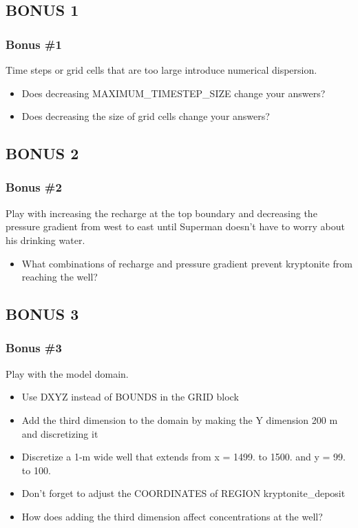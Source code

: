 \documentclass{beamer}
\begin{document}
\subsection{BONUS 1}

\begin{frame}[fragile]\frametitle{Bonus \#1}
Time steps or grid cells that are too large introduce numerical dispersion.

\begin{itemize}
  \item Does decreasing MAXIMUM\_TIMESTEP\_SIZE change your answers?
  \item Does decreasing the size of grid cells change your answers?
\end{itemize}

\end{frame}

\subsection{BONUS 2}

\begin{frame}[fragile]\frametitle{Bonus \#2}
Play with increasing the recharge at the top boundary and decreasing the pressure gradient from west to east until Superman doesn't have to worry about his drinking water.

\begin{itemize}
  \item What combinations of recharge and pressure gradient prevent kryptonite from reaching the well?
\end{itemize}

\end{frame}

\subsection{BONUS 3}

\begin{frame}[fragile]\frametitle{Bonus \#3}
Play with the model domain.

\begin{itemize}
  \item Use DXYZ instead of BOUNDS in the GRID block
  \item Add the third dimension to the domain by making the Y dimension 200 m and discretizing it
  \item Discretize a 1-m wide well that extends from x = 1499. to 1500. and y = 99. to 100.
  \item Don't forget to adjust the COORDINATES of REGION kryptonite\_deposit
  \item How does adding the third dimension affect concentrations at the well?
\end{itemize}

\end{frame}
\end{document}

